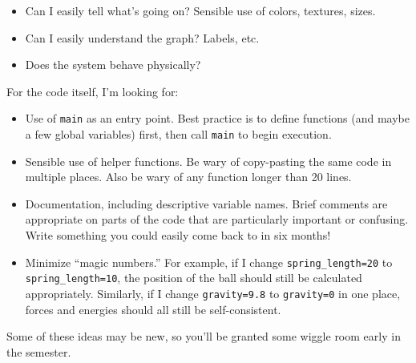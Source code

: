 \documentclass[10pt]{article}
\begin{document}
\begin{itemize}
    \item Can I easily tell what's going on? Sensible use of colors, textures, sizes. 
    \item Can I easily understand the graph? Labels, etc.
    \item Does the system behave physically?
\end{itemize}

For the code itself, I'm looking for:

\begin{itemize}
    \item Use of \texttt{main} as an entry point. Best practice is to define functions (and maybe a few global variables) first, then call \texttt{main} to begin execution.
    \item Sensible use of helper functions. Be wary of copy-pasting the same code in multiple places. Also be wary of any function longer than 20 lines.
    \item Documentation, including descriptive variable names. Brief comments are appropriate on parts of the code that are particularly important or confusing. Write something you could easily come back to in six months!
    \item Minimize ``magic numbers.'' For example, if I change \texttt{spring\_length=20} to \texttt{spring\_length=10}, the position of the ball should still be calculated appropriately. Similarly, if I change \texttt{gravity=9.8} to \texttt{gravity=0} in one place, forces and energies should all still be self-consistent. 
\end{itemize}

Some of these ideas may be new, so you'll be granted some wiggle room early in the semester.
\end{document}
